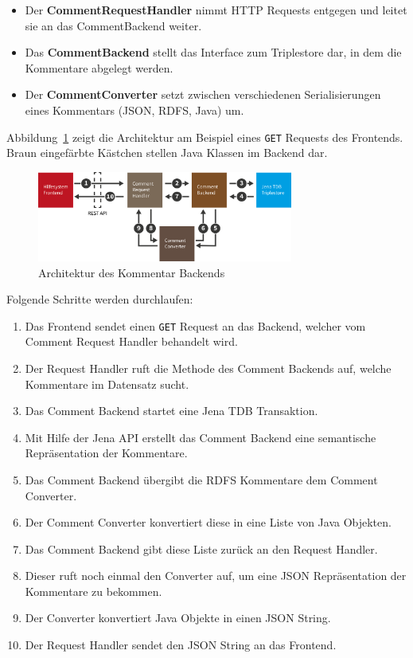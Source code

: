 \documentclass[
	headsepline,
	footsepline,
	fontsize=12pt,
	bibliography=totoc
]{scrbook}
\begin{document}
\begin{itemize}
	\item Der \textbf{CommentRequestHandler} nimmt HTTP Requests entgegen und leitet sie an das CommentBackend weiter.
	\item Das \textbf{CommentBackend} stellt das Interface zum Triplestore dar, in dem die Kommentare abgelegt werden.
	\item Der \textbf{CommentConverter} setzt zwischen verschiedenen Serialisierungen eines Kommentars (JSON, RDFS, Java) um.
\end{itemize}

Abbildung~\ref{figure:kommentare-backend-architektur} zeigt die Architektur am Beispiel eines \texttt{GET} Requests des Frontends. Braun eingefärbte Kästchen stellen Java Klassen im Backend dar.

\begin{figure}[htbp]
   \centering
   \includegraphics[width=0.75\textwidth]{images/implementierung-kommentare-backend-architektur.png}
   \caption{Architektur des Kommentar Backends}
   \label{figure:kommentare-backend-architektur}
\end{figure}

Folgende Schritte werden durchlaufen:

\begin{enumerate}
	\item Das Frontend sendet einen \texttt{GET} Request an das Backend, welcher vom Comment Request Handler behandelt wird.
	\item Der Request Handler ruft die Methode des Comment Backends auf, welche Kommentare im Datensatz sucht.
	\item Das Comment Backend startet eine Jena TDB Transaktion.
	\item Mit Hilfe der Jena API erstellt das Comment Backend eine semantische Repräsentation der Kommentare.
	\item Das Comment Backend übergibt die RDFS Kommentare dem Comment Converter.
	\item Der Comment Converter konvertiert diese in eine Liste von Java Objekten.
	\item Das Comment Backend gibt diese Liste zurück an den Request Handler.
	\item Dieser ruft noch einmal den Converter auf, um eine JSON Repräsentation der Kommentare zu bekommen.
	\item Der Converter konvertiert Java Objekte in einen JSON String.
	\item Der Request Handler sendet den JSON String an das Frontend.
\end{enumerate}
\end{document}
